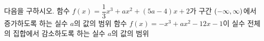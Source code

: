 다음을 구하시오.
 함수 $f(x)=\dfrac{1}{3}x^3+ax^2+(5a-4)x+2$가 구간 $(-\infty{,}\mkern3mu\mathopen{}\infty)$에서 증가하도록 하는 실수 $a$의 값의 범위
 함수 $f(x)=-x^3+ax^2-12x-1$이 실수 전체의 집합에서 감소하도록 하는 실수 $a$의 값의 범위
